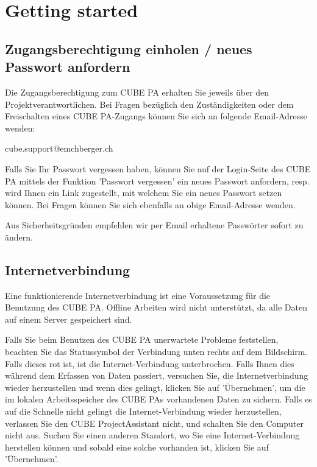 
\section{Getting started}
\subsection{Zugangsberechtigung einholen / neues Passwort anfordern}


Die Zugangsberechtigung zum CUBE PA erhalten Sie jeweils über den Projektverantwortlichen. Bei Fragen bezüglich den Zuständigkeiten oder dem Freischalten eines CUBE PA-Zugangs können Sie sich an folgende Email-Adresse wenden:

\vspace{\baselineskip}

{\color{red} cube.support@emchberger.ch}

\vspace{\baselineskip}

Falls Sie Ihr Passwort vergessen haben, können Sie auf der Login-Seite des CUBE PA mittels der Funktion 'Passwort vergessen' ein neues Passwort anfordern, resp. wird Ihnen ein Link zugestellt, mit welchem Sie ein neues Passwort setzen können. Bei Fragen können Sie sich ebenfalls an obige Email-Adresse wenden.

\vspace{\baselineskip}

Aus Sicherheitsgründen empfehlen wir per Email erhaltene Passwörter sofort zu ändern.

\subsection{Internetverbindung}

Eine funktionierende Internetverbindung ist eine Voraussetzung für die Benutzung des CUBE PA. Offline Arbeiten wird nicht unterstützt, da alle Daten auf einem Server gespeichert sind.

\vspace{\baselineskip}

Falls Sie beim Benutzen des CUBE PA unerwartete Probleme feststellen, beachten Sie das Statussymbol der Verbindung unten rechts auf dem Bildschirm. Falls dieses rot ist, ist die Internet-Verbindung unterbrochen. Falls Ihnen dies während dem Erfassen von Daten passiert, versuchen Sie, die Internetverbindung wieder herzustellen und wenn dies gelingt, klicken Sie auf 'Übernehmen', um die im lokalen Arbeitsspeicher des CUBE PAs vorhandenen Daten zu sichern. Falls es auf die Schnelle nicht gelingt die Internet-Verbindung wieder herzustellen, verlassen Sie den CUBE ProjectAssistant nicht, und schalten Sie den Computer nicht aus. Suchen Sie einen anderen Standort, wo Sie eine Internet-Verbindung herstellen
können und sobald eine solche vorhanden ist, klicken Sie auf 'Übernehmen'.

